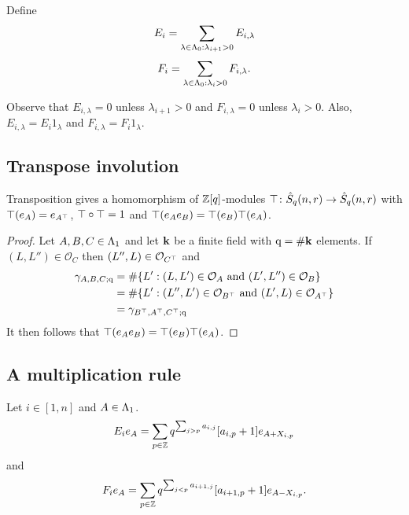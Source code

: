 \documentclass[a4paper, 11pt]{report}
\begin{document}
Define
\begin{equation*}
E_i = \sum_{\lambda\in{\Lambda_0}:\lambda_{i+1}>0} E_{i,\lambda}
\end{equation*}
\begin{equation*}
F_i = \sum_{\lambda\in{\Lambda_0}:\lambda_i>0} F_{i,\lambda}.
\end{equation*}

Observe that $E_{i,\lambda}=0$ unless $\lambda_{i+1} > 0$ and $F_{i,\lambda}=0$ unless $\lambda_i > 0$. Also, $E_{i,\lambda} = E_i 1_\lambda$ and $F_{i,\lambda} = F_i 1_\lambda$.

\subsection{Transpose involution}

\begin{lemma}\label{lemma:transpose-involution}
Transposition gives a homomorphism of $\mathbb{Z}[q]$-modules $\top\colon\hat{S}_q(n,r)\to\hat{S}_q(n,r)$ with $\top(e_A) = e_{A^\top}$, $\top\circ\top = 1$ and $\top(e_A e_B) = \top(e_B)\top(e_A)$.
\end{lemma}
\begin{proof}
Let $A,B,C\in{\Lambda_1}$ and let $\mathbf{k}$ be a finite field with $\mathrm{q}=\#\mathbf{k}$ elements. If $(L,L'')\in\mathcal{O}_C$ then $(L'',L)\in\mathcal{O}_{C^\top}$ and
\begin{align*}
\gamma_{A,B,C;\mathrm{q}}
&= \#\{L': (L,L')\in\mathcal{O}_A\text{ and } (L',L'')\in\mathcal{O}_B\}\\
&= \#\{L': (L'',L')\in\mathcal{O}_{B^\top}\text{ and } (L',L)\in\mathcal{O}_{A^\top}\}\\
&= \gamma_{B^\top,A^\top, C^\top;\mathrm{q}}
\end{align*}
It then follows that $\top(e_A e_B) = \top(e_B) \top(e_A)$.
\end{proof}

\subsection{A multiplication rule}

\begin{lemma}
Let $i\in [1,n]$ and $A\in{\Lambda_1}$.
\begin{equation*}
E_ie_A = \sum_{p\in\mathbb{Z}} q^{\sum_{j>p} a_{i,j}}[a_{i,p}+1] e_{A + X_{i,p}}
\end{equation*}
and
\begin{equation*}                                                                               
F_ie_A = \sum_{p\in\mathbb{Z}} q^{\sum_{j<p} a_{i+1,j}}[a_{i+1,p}+1] e_{A - X_{i,p}}.
\end{equation*}
\end{lemma}
\end{document}
